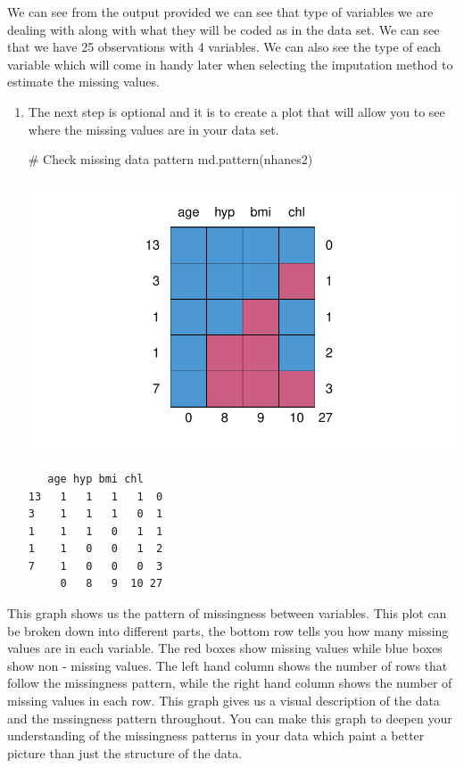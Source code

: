 \documentclass[
  letterpaper,
  DIV=11,
  numbers=noendperiod]{scrreprt}
\newenvironment{Shaded}{\begin{snugshade}}{\end{snugshade}}
\newcommand{\CommentTok}[1]{\textcolor[rgb]{0.37,0.37,0.37}{#1}}
\newcommand{\FunctionTok}[1]{\textcolor[rgb]{0.28,0.35,0.67}{#1}}
\newcommand{\NormalTok}[1]{\textcolor[rgb]{0.00,0.23,0.31}{#1}}
\begin{document}
We can see from the output provided we can see that type of variables we
are dealing with along with what they will be coded as in the data set.
We can see that we have 25 observations with 4 variables. We can also
see the type of each variable which will come in handy later when
selecting the imputation method to estimate the missing values.

\begin{enumerate}
\def\labelenumi{\arabic{enumi}.}
\setcounter{enumi}{1}
\item
  The next step is optional and it is to create a plot that will allow
  you to see where the missing values are in your data set.

\begin{Shaded}
\begin{Highlighting}[]
\CommentTok{\# Check missing data pattern}
\FunctionTok{md.pattern}\NormalTok{(nhanes2)}
\end{Highlighting}
\end{Shaded}

  \includegraphics{guide_files/figure-pdf/unnamed-chunk-2-1.pdf}

\begin{verbatim}
   age hyp bmi chl   
13   1   1   1   1  0
3    1   1   1   0  1
1    1   1   0   1  1
1    1   0   0   1  2
7    1   0   0   0  3
     0   8   9  10 27
\end{verbatim}
\end{enumerate}

This graph shows us the pattern of missingness between variables. This
plot can be broken down into different parts, the bottom row tells you
how many missing values are in each variable. The red boxes show missing
values while blue boxes show non - missing values. The left hand column
shows the number of rows that follow the missingness pattern, while the
right hand column shows the number of missing values in each row. This
graph gives us a visual description of the data and the mssingness
pattern throughout. You can make this graph to deepen your understanding
of the missingness patterns in your data which paint a better picture
than just the structure of the data.
\end{document}
